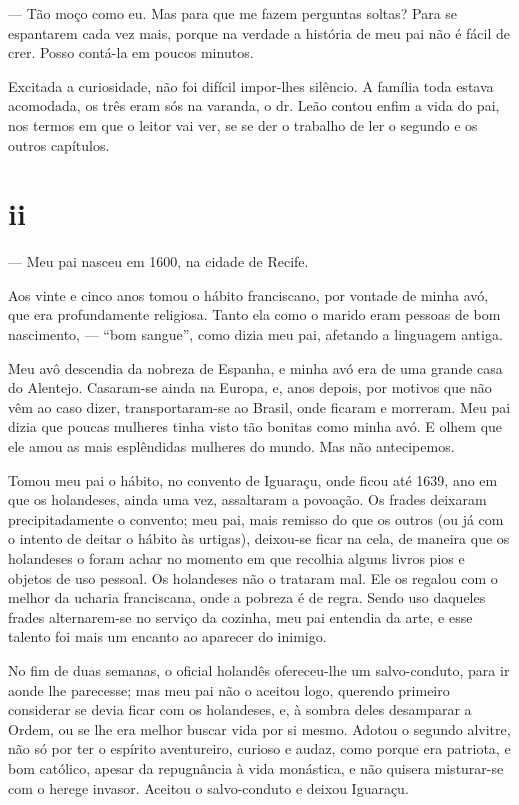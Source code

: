 --- Tão moço como eu. Mas para que me fazem perguntas soltas? Para se
espantarem cada vez mais, porque na verdade a história de meu pai não é
fácil de crer. Posso contá-la em poucos minutos.

Excitada a curiosidade, não foi difícil impor-lhes silêncio. A família
toda estava acomodada, os três eram sós na varanda, o dr. Leão contou
enfim a vida do pai, nos termos em que o leitor vai ver, se se der o
trabalho de ler o segundo e os outros capítulos.



\section{ii}



--- Meu pai nasceu em 1600, na cidade de Recife.

Aos vinte e cinco anos tomou o hábito franciscano, por vontade de minha
avó, que era profundamente religiosa. Tanto ela como o marido eram
pessoas de bom nascimento, --- ``bom sangue'', como dizia meu pai,
afetando a linguagem antiga.

Meu avô descendia da nobreza de Espanha, e minha avó era de uma grande
casa do Alentejo. Casaram-se ainda na Europa, e, anos depois, por
motivos que não vêm ao caso dizer, transportaram-se ao Brasil, onde
ficaram e morreram. Meu pai dizia que poucas mulheres tinha visto tão
bonitas como minha avó. E olhem que ele amou as mais esplêndidas
mulheres do mundo. Mas não antecipemos.

Tomou meu pai o hábito, no convento de Iguaraçu, onde ficou até 1639,
ano em que os holandeses, ainda uma vez, assaltaram a povoação. Os
frades deixaram precipitadamente o convento; meu pai, mais remisso do
que os outros (ou já com o intento de deitar o hábito às urtigas),
deixou-se ficar na cela, de maneira que os holandeses o foram achar no
momento em que recolhia alguns livros pios e objetos de uso pessoal. Os
holandeses não o trataram mal. Ele os regalou com o melhor da ucharia
franciscana, onde a pobreza é de regra. Sendo uso daqueles frades
alternarem-se no serviço da cozinha, meu pai entendia da arte, e esse
talento foi mais um encanto ao aparecer do inimigo.

No fim de duas semanas, o oficial holandês ofereceu-lhe um
salvo-conduto, para ir aonde lhe parecesse; mas meu pai não o aceitou
logo, querendo primeiro considerar se devia ficar com os holandeses, e,
à sombra deles desamparar a Ordem, ou se lhe era melhor buscar vida por
si mesmo. Adotou o segundo alvitre, não só por ter o espírito
aventureiro, curioso e audaz, como porque era patriota, e bom católico,
apesar da repugnância à vida monástica, e não quisera misturar-se com o
herege invasor. Aceitou o salvo-conduto e deixou Iguaraçu.

